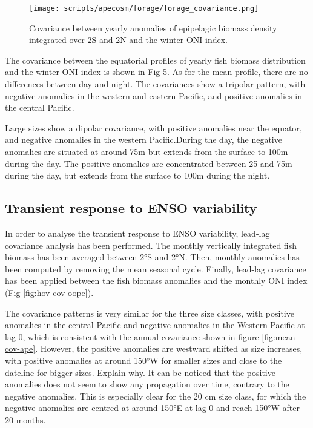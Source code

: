 \begin{figure}[h!]
    \centering
    \texttt{[image: scripts/apecosm/forage/forage\_covariance.png]}
	\caption{Covariance between yearly anomalies of epipelagic biomass density integrated over 2\degree S and 2\degree N and the winter ONI index.}
    \label{fig:covariance-forage}
\end{figure}

The covariance between the equatorial profiles of yearly fish biomass distribution and the winter ONI index is shown in Fig 5. As for the mean profile, there are no differences between day and night. The covariances show a tripolar pattern, with negative anomalies in the western and eastern Pacific, and positive anomalies in the central Pacific.

Large sizes show a dipolar covariance, with positive anomalies near the equator, and negative anomalies in the western Pacific.During the day, the negative anomalies are situated at around 75m but extends from the surface to 100m during the day. The positive anomalies are concentrated between 25 and 75m during the day, but extends from the surface to 100m during the night.

\subsection{Transient response to ENSO variability}

In order to analyse the transient response to ENSO variability, lead-lag covariance analysis has been performed. The monthly vertically integrated fish biomass has been averaged between 2°S and 2°N. Then, monthly anomalies has been computed by removing the mean seasonal cycle. Finally, lead-lag covariance has been applied between the fish biomass anomalies and the monthly ONI index (Fig \ref{fig:hov-cov-oope}).

The covariance patterns is very similar for the three size classes, with positive anomalies in the central Pacific and negative anomalies in the Western Pacific at lag 0, which is consistent with the annual covariance shown in figure \ref{fig:mean-cov-ape}. However, the positive anomalies are westward shifted as size increases, with positive anomalies at around 150°W for smaller sizes and close to the dateline for bigger sizes. Explain why. It can be noticed that the positive anomalies does not seem to show any propagation over time, contrary to the negative anomalies. This is especially clear for the 20 cm size class, for which the negative anomalies are centred at around 150°E at lag 0 and reach 150°W after 20 months.

